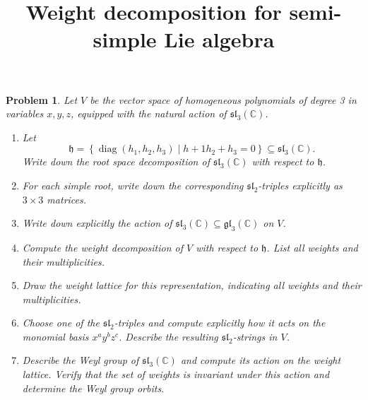 \documentclass[11pt, letterpaper]{article}
\title{Weight decomposition for semi-simple Lie algebra}
\theoremstyle{plain}
\newtheorem{problem}{Problem}
\begin{document}
\makeproblem

\begin{problem}
	Let $V$ be the vector space of homogeneous polynomials of degree 3 in variables $x,y,z$, equipped with the natural action of $\mathfrak{sl} _3(\mathbb{C} )$. 
	\begin{enumerate}
		\item Let
			\[
				\mathfrak{h} =\left\{ \operatorname{diag} (h_1,h_2,h_3)\mid h+1h_2+h_3=0 \right\} \subseteq \mathfrak{sl} _3(\mathbb{C} )
			.\]
			Write down the root space decomposition of $\mathfrak{sl} _3(\mathbb{C} )$ with respect to $\mathfrak{h} $.
		\item For each simple root, write down the corresponding $\mathfrak{sl} _2$-triples explicitly as $3\times 3$ matrices.
		\item Write down explicitly the action of $\mathfrak{sl} _3(\mathbb{C} )\subseteq \mathfrak{gl} _3(\mathbb{C} )$ on $V$.
		\item Compute the weight decomposition of $V$ with respect to $\mathfrak{h} $. List all weights and their multiplicities.
		\item Draw the weight lattice for this representation, indicating all weights and their multiplicities.
		\item Choose one of the $\mathfrak{sl} _2$-triples and compute explicitly how it acts on the monomial basis $x^ay^bz^c$. Describe the resulting $\mathfrak{sl} _2$-strings in $V$.
		\item Describe the Weyl group of $\mathfrak{sl} _3(\mathbb{C} )$ and compute its action on the weight lattice. Verify that the set of weights is invariant under this action and determine the Weyl group orbits.
	\end{enumerate}
\end{problem}
\end{document}
